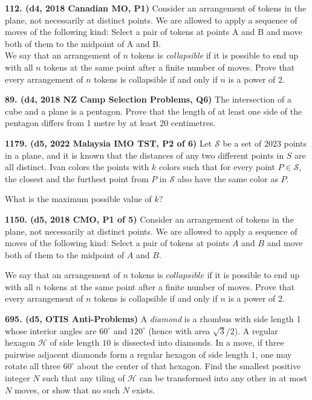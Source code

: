 \documentclass{article}
\begin{document}
\textbf{112. (\color{red}d4\color{black}, 2018 Canadian MO, P1)} Consider an arrangement of tokens in the plane, not necessarily at distinct points. We are allowed to apply a sequence of moves of the following kind: Select a pair of tokens at points A and B and move both of them to the midpoint of A and B.\\
We say that an arrangement of \(n\) tokens is \textit{collapsible} if it is possible to end up with all \(n\) tokens at the same point after a finite number of moves. Prove that every arrangement of \(n\) tokens is collapsible if and only if \(n\) is a power of 2.

\textbf{89. (\color{red}d4\color{black}, 2018 NZ Camp Selection Problems, Q6)} The intersection of a cube and a plane is a pentagon. Prove that the length of at least one side of the pentagon differs from 1 metre by at least 20 centimetres. 

\textbf{1179. (\color{red}d5\color{black}, 2022 Malaysia IMO TST, P2 of 6)} Let $\mathcal{S}$ be a set of $2023$ points in a plane, and it is known that the distances of any two different points in $S$ are all distinct. Ivan colors the points with $k$ colors such that for every point $P \in \mathcal{S}$, the closest and the furthest point from $P$ in $\mathcal{S}$ also have the same color as $P$.

What is the maximum possible value of $k$?

\textbf{1150. (\color{red}d5\color{black}, 2018 CMO, P1 of 5)} Consider an arrangement of tokens in the plane, not necessarily at distinct points. We are allowed
to apply a sequence of moves of the following kind: Select a pair of tokens at points $A$ and $B$ and
move both of them to the midpoint of $A$ and $B$.

We say that an arrangement of $n$ tokens is $collapsible$ if it is possible to end up with all $n$ tokens at
the same point after a finite number of moves. Prove that every arrangement of $n$ tokens is
collapsible if and only if $n$ is a power of 2.

\textbf{695. (\color{red}d5\color{black}, OTIS Anti-Problems)} A \emph{diamond} is a rhombus with side length 1 whose interior angles are $60^{\circ}$ and $120^{\circ}$ (hence with area $\sqrt{3}/2$). A regular hexagon $\mathcal{H}$ of side length $10$ is dissected into diamonds. In a move, if three pairwise adjacent diamonds form a regular hexagon of side length $1$, one may rotate all three $60^{\circ}$ about the center of that hexagon. Find the smallest positive integer $N$ such that any tiling of $\mathcal{H}$ can be transformed into any other in at most $N$ moves, or show that no such $N$ exists.
\end{document}
